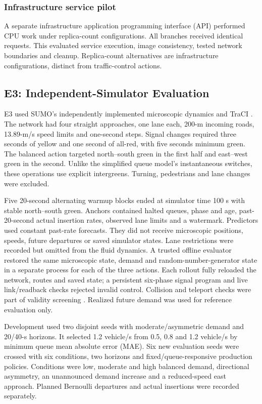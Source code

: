 \documentclass[conference,letterpaper]{IEEEtran}
\begin{document}
\subsubsection{Infrastructure service pilot}
A separate infrastructure application programming interface (API) performed CPU
work under replica-count configurations. All branches received identical
requests. This evaluated service execution, image consistency, tested network
boundaries and cleanup. Replica-count alternatives are infrastructure
configurations, distinct from traffic-control actions.

\subsection{E3: Independent-Simulator Evaluation}
\label{sec:sumo-method}
E3 used SUMO's independently implemented microscopic dynamics and TraCI
\cite{sumo2018,sumo-save-state,sumo-tls}. The network had four straight
approaches, one lane each, 200-m incoming roads, 13.89-m/s speed limits and
one-second steps. Signal changes required three seconds of yellow and one
second of all-red, with five seconds minimum green. The balanced action
targeted north--south green in the first half and east--west green in the
second. Unlike the simplified queue model's instantaneous switches, these
operations use explicit intergreens. Turning, pedestrians and lane changes
were excluded.

Five 20-second alternating warmup blocks ended at simulator time 100 s with
stable north--south green. Anchors contained halted queues, phase and age,
past-20-second actual insertion rates, observed lane limits and a watermark.
Predictors used constant past-rate forecasts. They did not receive microscopic
positions, speeds, future departures or saved simulator states. Lane restrictions
were recorded but omitted from the fluid dynamics. A trusted offline evaluator
restored the same microscopic state, demand and random-number-generator state
in a separate process for each of the three actions. Each rollout fully
reloaded the network, routes and saved state; a persistent six-phase signal
program and live link/readback checks rejected invalid control. Collision and
teleport checks were part of validity screening \cite{sumo-save-state}.
Realized future demand was used for reference evaluation only.

Development used two disjoint seeds with moderate/asymmetric demand and 20/40-s
horizons. It selected 1.2 vehicle/s from 0.5, 0.8 and 1.2 vehicle/s by minimum
queue mean absolute error (MAE). Six new evaluation seeds were crossed with
six conditions, two horizons and fixed/queue-responsive production policies.
Conditions were low, moderate and high balanced demand, directional asymmetry,
an unannounced demand increase and a reduced-speed east approach. Planned
Bernoulli departures and actual insertions were recorded separately.
\end{document}
